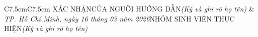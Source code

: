 \bigskip
\begin{table}[H]
\centering
\footnotesize
    \begin{tabular}{C{7.5cm}C{7.5cm}}
    XÁC NHẬN\newline CỦA NGƯỜI HƯỚNG DẪN\newline \textit{(Ký và ghi rõ họ tên)} & \textit{TP. Hồ Chí Minh, ngày 16 tháng 03 năm 2026}\newline NHÓM SINH VIÊN THỰC HIỆN\newline \textit{(Ký và ghi rõ họ tên)}
    \end{tabular}
\end{table}
